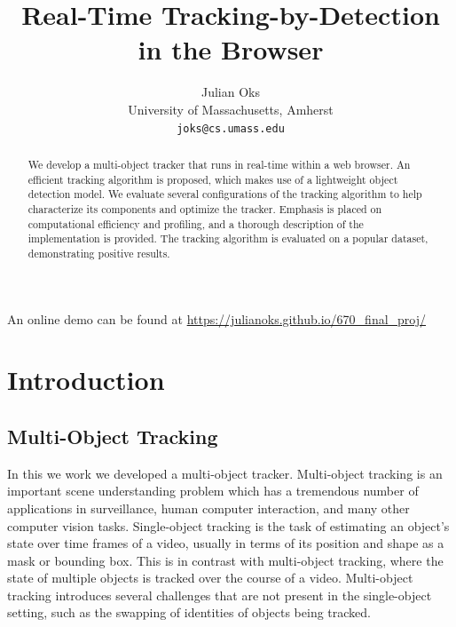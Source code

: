 \documentclass[10pt,twocolumn,letterpaper]{article}
\begin{document}
\title{Real-Time Tracking-by-Detection in the Browser}

\author{Julian Oks\\
University of Massachusetts, Amherst \\
{\tt\small joks@cs.umass.edu}
}




\maketitle
\ificcvfinal\thispagestyle{empty}\fi

\begin{abstract}
We develop a multi-object tracker that runs in real-time within a web browser.
An efficient tracking algorithm is proposed, which makes use of a lightweight object detection model.
We evaluate several configurations of the tracking algorithm to help characterize its components and optimize the tracker.
Emphasis is placed on computational efficiency and profiling, and a thorough description of the implementation is provided.
The tracking algorithm is evaluated on a popular dataset, demonstrating positive results.
\end{abstract}

\noindent An online demo can be found at \url{https://julianoks.github.io/670_final_proj/}

\section{Introduction}
\subsection{Multi-Object Tracking}
In this we work we developed a multi-object tracker. Multi-object tracking is an important scene understanding problem which has a tremendous number of applications in surveillance, human computer interaction, and many other computer vision tasks. Single-object tracking is the task of estimating an object's state over time frames of a video, usually in terms of its position and shape as a mask or bounding box. This is in contrast with multi-object tracking, where the state of multiple objects is tracked over the course of a video. Multi-object tracking introduces several challenges that are not present in the single-object setting, such as the swapping of identities of objects being tracked. 
\end{document}

